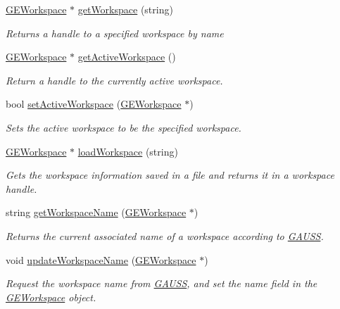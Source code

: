\begin{DoxyCompactItemize}
\hyperlink{class_g_e_workspace}{G\-E\-Workspace} $\ast$ \hyperlink{class_g_a_u_s_s_a5d3dc85b8f31111c6bf3a2d8286c915e}{get\-Workspace} (string)
\begin{DoxyCompactList}\small\item\em Returns a handle to a specified workspace by {\itshape name} \end{DoxyCompactList}\item 
\hyperlink{class_g_e_workspace}{G\-E\-Workspace} $\ast$ \hyperlink{class_g_a_u_s_s_a566a50d644d0d1f55dba90416de4961a}{get\-Active\-Workspace} ()
\begin{DoxyCompactList}\small\item\em Return a handle to the currently active workspace. \end{DoxyCompactList}\item 
bool \hyperlink{class_g_a_u_s_s_a7ff4b1140967c6737918728227fa1419}{set\-Active\-Workspace} (\hyperlink{class_g_e_workspace}{G\-E\-Workspace} $\ast$)
\begin{DoxyCompactList}\small\item\em Sets the active workspace to be the specified workspace. \end{DoxyCompactList}\item 
\hyperlink{class_g_e_workspace}{G\-E\-Workspace} $\ast$ \hyperlink{class_g_a_u_s_s_a294a07247f6c7d8464ce5e79a97025a3}{load\-Workspace} (string)
\begin{DoxyCompactList}\small\item\em Gets the workspace information saved in a file and returns it in a workspace handle. \end{DoxyCompactList}\item 
string \hyperlink{class_g_a_u_s_s_aec6202efa12949e7a7e9addfedbc3ded}{get\-Workspace\-Name} (\hyperlink{class_g_e_workspace}{G\-E\-Workspace} $\ast$)
\begin{DoxyCompactList}\small\item\em Returns the current associated name of a workspace according to \hyperlink{class_g_a_u_s_s}{G\-A\-U\-S\-S}. \end{DoxyCompactList}\item 
void \hyperlink{class_g_a_u_s_s_a626d736a417fd10e0b51087e944c5e56}{update\-Workspace\-Name} (\hyperlink{class_g_e_workspace}{G\-E\-Workspace} $\ast$)
\begin{DoxyCompactList}\small\item\em Request the workspace name from \hyperlink{class_g_a_u_s_s}{G\-A\-U\-S\-S}, and set the {\itshape name} field in the \hyperlink{class_g_e_workspace}{G\-E\-Workspace} object. \end{DoxyCompactList}\item 

\end{DoxyCompactItemize}
